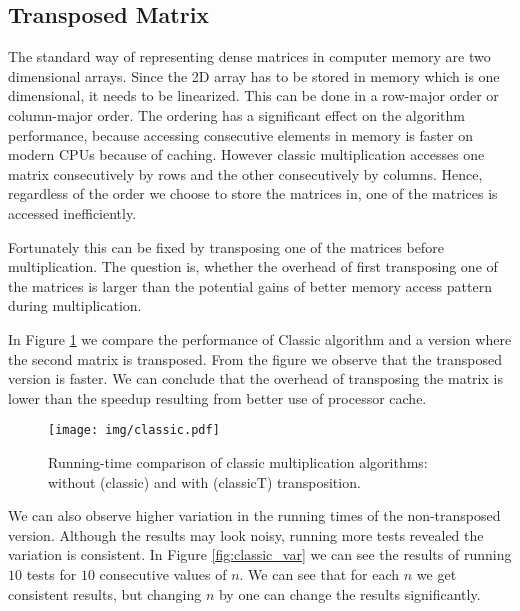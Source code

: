 \documentclass[a4paper,11pt]{article}
\begin{document}

\subsection{Transposed Matrix}
\label{classic_transposed}
The standard way of representing dense matrices in computer memory are two dimensional arrays. Since the 2D array has to be stored in memory which is one dimensional, it needs to be linearized. This can be done in a row-major order or column-major order\cite{Knuth1997}. The ordering has a significant effect on the algorithm performance, because accessing consecutive elements in memory is faster on modern CPUs because of caching. However classic multiplication accesses one matrix consecutively by rows and the other consecutively by columns. Hence, regardless of the order we choose to store the matrices in, one of the matrices is accessed inefficiently.

Fortunately this can be fixed by transposing one of the matrices before multiplication. The question is, whether the overhead of first transposing one of the matrices is larger than the potential gains of better memory access pattern during multiplication.

In Figure \ref{fig:classic} we compare the performance of Classic algorithm and a version where the second matrix is transposed.
From the figure we observe that the transposed version is faster. We can conclude that the overhead of transposing the matrix is lower than the speedup resulting from better use of processor cache.

\begin{figure}[h]
\centering
\texttt{[image: img/classic.pdf]}
\caption{Running-time comparison of classic multiplication algorithms: without (\textsf{classic}) and with (\textsf{classicT}) transposition.}
\label{fig:classic}
\end{figure}


We can also observe higher variation in the running times of the non-transposed version. Although the results may look noisy, running more tests revealed the variation is consistent. In Figure \ref{fig:classic_var} we can see the results of running $10$ tests for $10$ consecutive values of $n$. We can see that for each $n$ we get consistent results, but changing $n$ by one can change the results significantly.  
\end{document}
